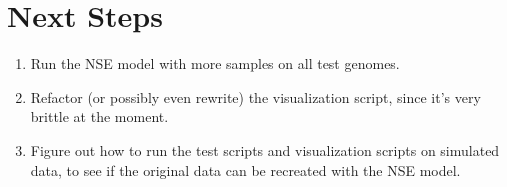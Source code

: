 \documentclass[12 pt]{article}
\begin{document}
 		\section{Next Steps}
	 		\begin{enumerate}
	 			\item Run the NSE model with more samples on all test genomes.
	 			\item Refactor (or possibly even rewrite) the visualization script, since it's very brittle at the moment.
	 			\item Figure out how to run the test scripts and visualization scripts on simulated data, to see if the original data can be recreated with the NSE model.
	 		\end{enumerate}
\end{document}

